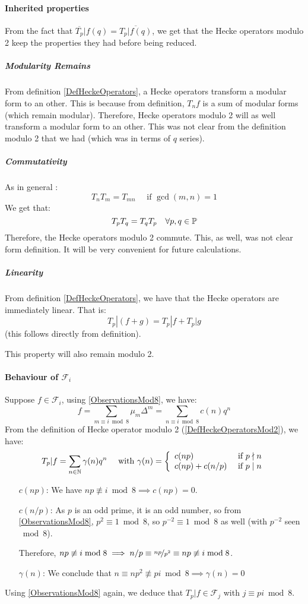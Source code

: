 \paragraph{Inherited properties}
From the fact that $\overline{T_p}|f(q) = \overline{T_p|f(q)}$, we get that the Hecke operators modulo 2 keep the properties they had before being reduced.
\subparagraph{Modularity Remains}
\label{HekeModular}
From definition \ref{DefHeckeOperators}, a Hecke operators transform a modular form to an other.
This is because from definition, $T_nf$ is a sum of modular forms (which remain modular).
Therefore, Hecke operators modulo 2 will as well transform a modular form to an other.
This was not clear from the definition modulo 2 that we had (which was in terms of $q$ series).
\subparagraph{Commutativity}
\label{HekeCommute}
As in general \cite[p.101]{CourseInArithmetic}:
$$
T_nT_m = T_{mn} \quad \text{ if } \gcd(m,n)=1
$$
We get that:
$$
T_pT_q=T_qT_p \quad \forall p,q \in \mathbb{P}
$$
Therefore, the Hecke operators modulo 2 commute.
This, as well, was not clear form definition.
It will be very convenient for future calculations.
\subparagraph{Linearity}
\label{HekeLinear}
From definition \ref{DefHeckeOperators}, we have that the Hecke operators are immediately linear.
That is:
$$
T_p|(f+g) = T_p|f + T_p|g
$$
(this follows directly from definition).

This property will also remain modulo 2.

\paragraph{Behaviour of $\mathcal{F}_i$}
\label{HeckeInF_i}
Suppose $f \in \mathcal{F}_i$, using \ref{ObservationsMod8}, we have:
$$
f
= \sum_{m \equiv i \bmod 8} \mu_m\Delta^m 
= \sum_{n \equiv i \bmod 8} c(n)q^n
$$
From the definition of Hecke operator modulo 2 (\ref{DefHeckeOperatorsMod2}), we have:
$$
T_p|f
= \sum_{n \in \mathbb{N}} \gamma(n)q^n
\quad \text{ with }
\gamma(n) = 
\left\lbrace 
\begin{array}{l l}
c(np)        & \text{ if } p \nmid n \\
c(np)+c(n/p) & \text{ if } p \mid  n
\end{array}
\right.
$$
\begin{enumerate}
	\item [$c(np)$:] We have $np \not \equiv i \bmod 8 \implies c(np) = 0$.
	\item [$c(n/p)$:] As $p$ is an odd prime, it is an odd number, so from \ref{ObservationsMod8}, $p^2 \equiv 1 \bmod 8$, so $p^{-2} \equiv 1 \bmod 8$ as well (with $p^{-2}$ seen $\bmod 8$).
	
	Therefore, $np \not\equiv i \bmod 8 \implies  n/p \equiv \nicefrac{np}{p^2} \equiv np \not\equiv i \bmod 8 $.
	
	\item [$\gamma(n)$:] We conclude that $n \equiv np^2 \not\equiv pi \bmod 8 \implies \gamma(n) = 0$
\end{enumerate}
Using \ref{ObservationsMod8} again, we deduce that $T_p|f \in \mathcal{F}_j$ with $j \equiv pi \bmod 8$.

